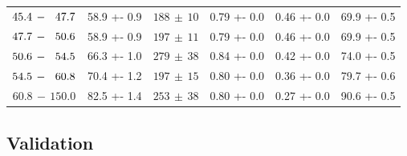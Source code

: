 \begin{table}[!htb]
\begin{tabular}{cS[table-format=2.1(1)]cS[table-format=1.2(2)]S[table-format=1.2(1)]S[table-format=2.1(1)]}
        \( 45.4\,-\,\047.7\) & 58.9 +- 0.9 & \( 188\,\pm\, 10\) & 0.79 +- 0.0 & 0.46 +- 0.0 & 69.9 +- 0.5 \tabularnewline
        \( 47.7\,-\,\050.6\) & 58.9 +- 0.9 & \( 197\,\pm\, 11\) & 0.79 +- 0.0 & 0.46 +- 0.0 & 69.9 +- 0.5 \tabularnewline
        \( 50.6\,-\,\054.5\) & 66.3 +- 1.0 & \( 279\,\pm\, 38\) & 0.84 +- 0.0 & 0.42 +- 0.0 & 74.0 +- 0.5 \tabularnewline
        \( 54.5\,-\,\060.8\) & 70.4 +- 1.2 & \( 197\,\pm\, 15\) & 0.80 +- 0.0 & 0.36 +- 0.0 & 79.7 +- 0.6 \tabularnewline
        \( 60.8\,-\, 150.0\) & 82.5 +- 1.4 & \( 253\,\pm\, 38\) & 0.80 +- 0.0 & 0.27 +- 0.0 & 90.6 +- 0.5 \tabularnewline
        \bottomrule
    \end{tabular}
\end{table}

\clearpage
\subsection{Validation}

